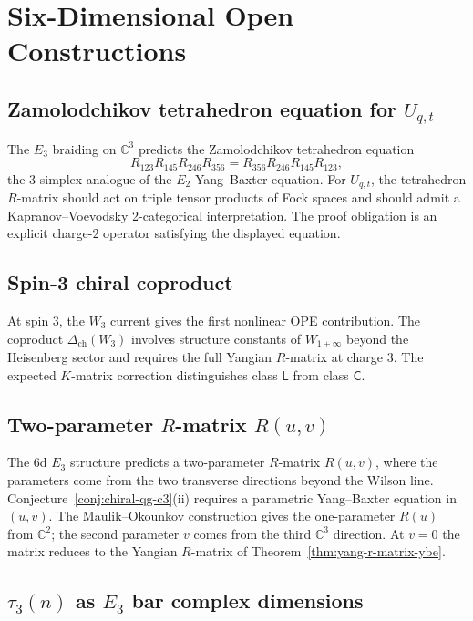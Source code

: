 \documentclass[11pt]{article}
\newcommand{\C}{\mathbb{C}}
\theoremstyle{plain}
\theoremstyle{definition}
\theoremstyle{remark}
\begin{document}
\section{Six-Dimensional Open Constructions}

\subsection{Zamolodchikov tetrahedron equation for $U_{q,t}$}

The $E_3$ braiding on $\C^3$ predicts the Zamolodchikov tetrahedron
equation
\[
 R_{123}R_{145}R_{246}R_{356}
 =
 R_{356}R_{246}R_{145}R_{123},
\]
the $3$-simplex analogue of the $E_2$ Yang--Baxter equation. For
$U_{q,t}$, the tetrahedron $R$-matrix should act on triple tensor
products of Fock spaces and should admit a Kapranov--Voevodsky
2-categorical interpretation. The proof obligation is an explicit
charge-$2$ operator satisfying the displayed equation.

\subsection{Spin-3 chiral coproduct}

At spin $3$, the $W_3$ current gives the first nonlinear OPE
contribution. The coproduct $\Delta_{\mathrm{ch}}(W_3)$ involves
structure constants of $W_{1+\infty}$ beyond the Heisenberg sector and
requires the full Yangian $R$-matrix at charge $3$. The expected
$K$-matrix correction distinguishes class $\mathsf{L}$ from class
$\mathsf{C}$.

\subsection{Two-parameter $R$-matrix $R(u,v)$}

The 6d $E_3$ structure predicts a two-parameter $R$-matrix $R(u,v)$,
where the parameters come from the two transverse directions beyond
the Wilson line. Conjecture~\ref{conj:chiral-qg-c3}(ii) requires a
parametric Yang--Baxter equation in $(u,v)$. The Maulik--Okounkov
construction gives the one-parameter $R(u)$ from $\C^2$; the second
parameter $v$ comes from the third $\C^3$ direction. At $v=0$ the
matrix reduces to the Yangian $R$-matrix of
Theorem~\ref{thm:yang-r-matrix-ybe}.

\subsection{$\tau_3(n)$ as $E_3$ bar complex dimensions}
\end{document}
